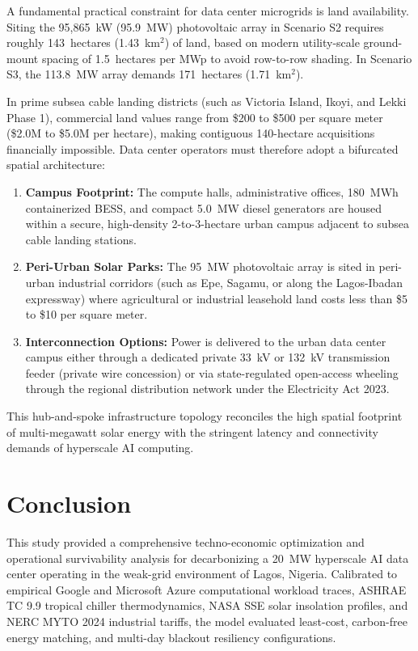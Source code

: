 \documentclass[11pt,a4paper]{article}
\begin{document}
A fundamental practical constraint for data center microgrids is land availability. Siting the 95,865~kW (95.9~MW) photovoltaic array in Scenario S2 requires roughly 143~hectares (1.43~km$^2$) of land, based on modern utility-scale ground-mount spacing of 1.5~hectares per MWp to avoid row-to-row shading. In Scenario S3, the 113.8~MW array demands 171~hectares (1.71~km$^2$).

In prime subsea cable landing districts (such as Victoria Island, Ikoyi, and Lekki Phase 1), commercial land values range from \$200 to \$500 per square meter (\$2.0M to \$5.0M per hectare), making contiguous 140-hectare acquisitions financially impossible. Data center operators must therefore adopt a bifurcated spatial architecture:
\begin{enumerate}
    \item \textbf{Campus Footprint:} The compute halls, administrative offices, 180~MWh containerized BESS, and compact 5.0~MW diesel generators are housed within a secure, high-density 2-to-3-hectare urban campus adjacent to subsea cable landing stations.
    \item \textbf{Peri-Urban Solar Parks:} The 95~MW photovoltaic array is sited in peri-urban industrial corridors (such as Epe, Sagamu, or along the Lagos-Ibadan expressway) where agricultural or industrial leasehold land costs less than \$5 to \$10 per square meter.
    \item \textbf{Interconnection Options:} Power is delivered to the urban data center campus either through a dedicated private 33~kV or 132~kV transmission feeder (private wire concession) or via state-regulated open-access wheeling through the regional distribution network under the Electricity Act 2023.
\end{enumerate}

This hub-and-spoke infrastructure topology reconciles the high spatial footprint of multi-megawatt solar energy with the stringent latency and connectivity demands of hyperscale AI computing.

\section{Conclusion}
\label{sec:concl}

This study provided a comprehensive techno-economic optimization and operational survivability analysis for decarbonizing a 20~MW hyperscale AI data center operating in the weak-grid environment of Lagos, Nigeria. Calibrated to empirical Google and Microsoft Azure computational workload traces, ASHRAE TC 9.9 tropical chiller thermodynamics, NASA SSE solar insolation profiles, and NERC MYTO 2024 industrial tariffs, the model evaluated least-cost, carbon-free energy matching, and multi-day blackout resiliency configurations.
\end{document}
